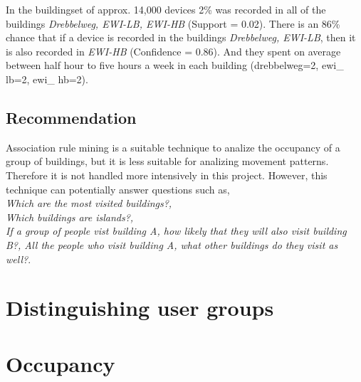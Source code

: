 In the buildingset of approx. 14,000 devices 2\% was recorded in all of the
buildings \textit{Drebbelweg, EWI-LB, EWI-HB} (Support = 0.02). There is an
86\% chance that if a device is recorded in the buildings \textit{Drebbelweg,
EWI-LB}, then it is also recorded in \textit{EWI-HB} (Confidence = 0.86). And
they spent on average between half hour to five hours a week in each building
(drebbelweg=2, ewi\_ lb=2, ewi\_ hb=2).

\subsection{Recommendation}
Association rule mining is a suitable technique to analize the occupancy of a
group of buildings, but it is less suitable for analizing movement patterns.
Therefore it is not handled more intensively in this project. However, this
technique can potentially answer questions such as,\\
\textit{Which are the most visited buildings?,\\
Which buildings are islands?,\\
If a group of people vist building A, how likely that they will also visit
building B?,
All the people who visit building A, what other buildings do they visit as
well?}.

\section{Distinguishing user groups}

\section{Occupancy}

